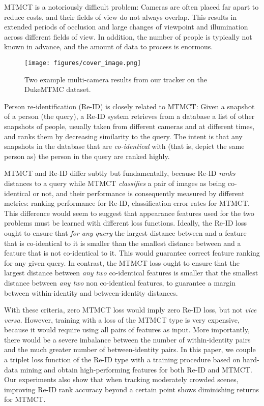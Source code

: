 \documentclass[10pt,twocolumn,letterpaper]{article}
\begin{document}
MTMCT is a notoriously difficult problem: Cameras are often placed far apart to reduce costs, and their fields of view do not always overlap. This results in extended periods of occlusion and large changes of viewpoint and illumination across different fields of view. In addition, the number of people is typically not known in advance, and the amount of data to process is enormous.

\begin{figure}[htb]
	\centering
	\texttt{[image: figures/cover\_image.png]}
	
	\label{fig:example}
	
	\caption{Two example multi-camera results from our tracker on the DukeMTMC dataset.}
\end{figure}



Person re-identification (Re-ID) is closely related to MTMCT: Given a snapshot of a person (the query), a Re-ID system retrieves from a database a list of other snapshots of people, usually taken from different cameras and at different times, and ranks them by decreasing similarity to the query. The intent is that any snapshots in the database that are \emph{co-identical} with (that is, depict the same person as) the person in the query are ranked highly.

MTMCT and Re-ID differ subtly but fundamentally, because Re-ID \emph{ranks} distances to a query while MTMCT \emph{classifies} a pair of images as being co-identical or not, and their performance is consequently measured by different metrics: ranking performance for Re-ID, classification error rates for MTMCT. This difference would seem to suggest that appearance features used for the two problems must be learned with different loss functions. Ideally, the Re-ID loss ought to ensure that \emph{for any query } the largest distance between  and a feature that is co-identical to it is smaller than the smallest distance between  and a feature that is not co-identical to it. This would guarantee correct feature ranking for any given query. In contrast, the MTMCT loss ought to ensure that the largest distance between \emph{any two} co-identical features is smaller that the smallest distance between \emph{any two} non co-identical features, to guarantee a margin between within-identity and between-identity distances.

With these criteria, zero MTMCT loss would imply zero Re-ID loss, but not \textit{vice versa}. However, training with a loss of the MTMCT type is very expensive, because it would require using all pairs of features as input. More importantly, there would be a severe imbalance between the number of within-identity pairs and the much greater number of between-identity pairs. In this paper, we couple a triplet loss function of the Re-ID type with a training procedure based on hard-data mining and obtain high-performing features for both Re-ID and MTMCT. Our experiments also show that when tracking moderately crowded scenes, improving Re-ID rank accuracy beyond a certain point shows diminishing returns for MTMCT.
\end{document}
